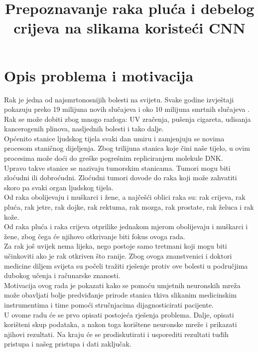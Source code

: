\documentclass[conference, utf8]{IEEEtran}
\begin{document}
	
	\title{Prepoznavanje raka pluća i debelog crijeva na slikama koristeći CNN}
	
	\author{
		\and
		\and
		\and
		\and
		\and
		}
	
	\maketitle
	
	\section{Opis problema i motivacija}
	Rak je jedna od najsmrtonosnijih bolesti na svijetu. Svake godine izvještaji pokazuju preko 19 milijuna novih slučajeva i oko 10 milijuna smrtnih slučajeva \cite{world2019international}. Rak se može dobiti zbog mnogo razloga: UV zračenja, pušenja cigareta, udisanja kancerogenih plinova, nasljednih bolesti i tako dalje.
	\\
	Općenito stanice ljudskog tijela svaki dan umiru i zamjenjuju se novima procesom staničnog dijeljenja. Zbog trilijuna stanica koje čini naše tijelo, u ovim procesima može doći do greške pogrešnim repliciranjem molekule DNK.
	\\
	Upravo takve stanice se nazivaju tumorskim stanicama. Tumori mogu biti zloćudni ili dobroćudni. Zloćudni tumori dovode do raka koji može zahvatiti skoro pa svaki organ ljudskog tijela.
	\\
	Od raka obolijevaju i muškarci i žene, a najčešći oblici raka su: rak crijeva, rak pluća, rak jetre, rak dojke, rak rektuma, rak mozga, rak prostate, rak želuca i rak kože.
	\\
	Od raka pluća i raka crijeva otprilike jednakom mjerom obolijevaju i muškarci i žene, zbog čega će njihovo otkrivanje biti fokus ovoga rada.
	\\
	Za rak još uvijek nema lijeka, nego postoje samo tretmani koji mogu biti učinkoviti ako je rak otkriven što ranije.
	Zbog ovoga znanstvenici i doktori medicine diljem svijeta su počeli tražiti rješenje protiv ove bolesti u područjima dubokog učenja i računarske znanosti.
	\\
	Motivacija ovog rada je pokazati kako se pomoću umjetnih neuronskih mreža može obavljati bolje predviđanje prirode stanica tkiva slikanim medicinskim instrumentima i time pomoći stručnjacima dijagnosticirati pacijente.
	\\
	U ovome radu će se prvo opisati postojeća rješenja problema. Dalje, opisati korišteni skup podataka, a nakon toga korištene neuronske mreže i prikazati njihovi rezultati. Na kraju će se prodiskutirati i usporediti rezultati tuđih pristupa i našeg pristupa i dati zaključak.
	
\end{document}
